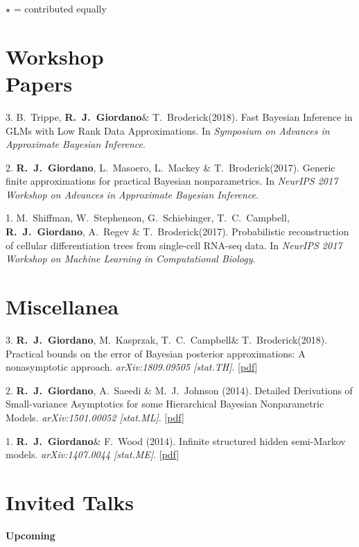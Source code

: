 \documentclass[margin,line]{res}
\newcommand{\me}{\textbf{R.~J.~Giordano}\xspace}
\newcommand{\trevor}{T.~C.~Campbell\xspace}
\newcommand{\tamara}{T.~Broderick\xspace}
\newcommand{\paperref}[1]{[\href{#1}{pdf}]}
\newcommand{\paperref}[1]{}
\begin{document}
\begin{resume}
$\star$ = contributed equally

\section{\sc Workshop \\ Papers}

3. B.~Trippe, \me \& \tamara (2018).
Fast Bayesian Inference in GLMs with Low Rank Data Approximations.
In \emph{Symposium on Advances in Approximate Bayesian Inference}.

2. \me, L.~Masoero, L.~Mackey \& \tamara (2017).
Generic finite approximations for practical Bayesian nonparametrics.
In \emph{NeurIPS 2017 Workshop on Advances in Approximate Bayesian Inference}.

1. M.~Shiffman, W.~Stephenson, G.~Schiebinger, \trevor, \me, A.~Regev \& \tamara (2017).
Probabilistic reconstruction of cellular differentiation trees from single-cell RNA-seq data.
In \emph{NeurIPS 2017 Workshop on Machine Learning in Computational Biology}.


\section{\sc Miscellanea}

3. \me, M.~Kasprzak, \trevor \& \tamara (2018).
Practical bounds on the error of Bayesian posterior approximations: A nonasymptotic approach.
\emph{arXiv:1809.09505 [stat.TH]}.
\paperref{https://arxiv.org/abs/1809.09505}

2. \me, A.~Saeedi \& M.~J.~Johnson (2014).
Detailed Derivations of Small-variance Asymptotics for some Hierarchical Bayesian Nonparametric Models.
\emph{arXiv:1501.00052 [stat.ML]}.
\paperref{http://arxiv.org/abs/1501.00052}

1. \me \& F.~Wood (2014).
Infinite structured hidden semi-Markov models.
\emph{arXiv:1407.0044 [stat.ME]}.
\paperref{http://arxiv.org/abs/1407.0044}



\section{\sc Invited Talks}

\textbf{Upcoming} \\[-.5em]


\end{resume}
\end{document}
